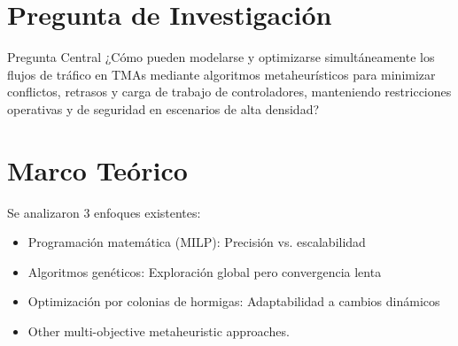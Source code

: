 \begin{minipage}{0.48\textwidth}

    \section{Pregunta de Investigación}
    \begin{questionBox}
        {Pregunta Central}{
            ¿Cómo pueden modelarse y optimizarse simultáneamente los flujos de tráfico en TMAs mediante algoritmos metaheurísticos para minimizar conflictos, retrasos y carga de trabajo de controladores, manteniendo restricciones operativas y de seguridad en escenarios de alta densidad?
        }
    \end{questionBox}

    \section{Marco Teórico}
    Se analizaron 3 enfoques existentes:
    \begin{itemize}[itemsep=1mm]\small
        \item Programación matemática (MILP): Precisión vs. escalabilidad
        \item Algoritmos genéticos: Exploración global pero convergencia lenta
        \item Optimización por colonias de hormigas: Adaptabilidad a cambios dinámicos
        \item Other multi-objective metaheuristic approaches.
    \end{itemize}


\end{minipage}
